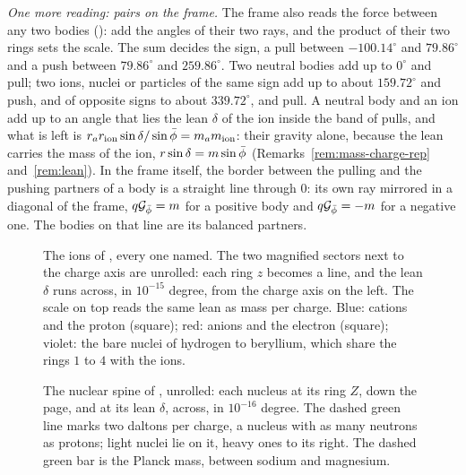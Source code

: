 \emph{One more reading: pairs on the frame.} The frame also reads the force between any two bodies (): add the angles of their two rays, and the product of their two rings sets the scale. The sum decides the sign, a pull between $-100.14^\circ$ and $79.86^\circ$ and a push between $79.86^\circ$ and $259.86^\circ$. Two neutral bodies add up to $0^\circ$ and pull; two ions, nuclei or particles of the same sign add up to about $159.72^\circ$ and push, and of opposite signs to about $339.72^\circ$, and pull. A neutral body and an ion add up to an angle that lies the lean $\delta$ of the ion inside the band of pulls, and what is left is $r_a r_{\mathrm{ion}}\sin\delta/\sin\bar{\phi} = m_a m_{\mathrm{ion}}$: their gravity alone, because the lean carries the mass of the ion, $r\sin\delta = m\sin\bar{\phi}$ (Remarks~\ref{rem:mass-charge-rep} and~\ref{rem:lean}). In the frame itself, the border between the pulling and the pushing partners of a body is a straight line through $0$: its own ray mirrored in a diagonal of the frame, $q\mathcal{G}_{\bar{\phi}} = m$ for a positive body and $q\mathcal{G}_{\bar{\phi}} = -m$ for a negative one. The bodies on that line are its balanced partners.

\begin{figure}[p]
\myfloatalign
\makebox[\textwidth][c]{}
\caption[The ions, every one named]{The ions of , every one named. The two magnified sectors next to the charge axis are unrolled: each ring $z$ becomes a line, and the lean $\delta$ runs across, in $10^{-15}$ degree, from the charge axis on the left. The scale on top reads the same lean as mass per charge. Blue: cations and the proton (square); red: anions and the electron (square); violet: the bare nuclei of hydrogen to beryllium, which share the rings $1$ to $4$ with the ions.}
\label{fig:sm-ions}
\end{figure}

\begin{figure}[p]
\myfloatalign
\makebox[\textwidth][c]{}
\caption[The nuclear spine]{The nuclear spine of , unrolled: each nucleus at its ring $Z$, down the page, and at its lean $\delta$, across, in $10^{-16}$ degree. The dashed green line marks two daltons per charge, a nucleus with as many neutrons as protons; light nuclei lie on it, heavy ones to its right. The dashed green bar is the Planck mass, between sodium and magnesium.}
\label{fig:sm-spine}
\end{figure}

